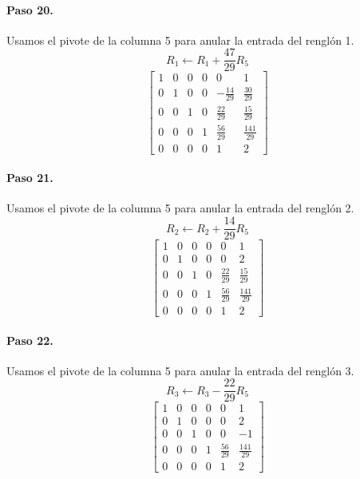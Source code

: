 \documentclass[12pt]{article}
\theoremstyle{remark}
\begin{document}
\paragraph{Paso 20.} Usamos el pivote de la columna 5 para anular la entrada del renglón 1.
\[
R_{1}\leftarrow R_{1}+\frac{47}{29}R_{5}
\]
\[
\left[\begin{array}{ccccc|c}
1 & 0 & 0 & 0 & 0 & 1\\
0 & 1 & 0 & 0 & - \frac{14}{29} & \frac{30}{29}\\
0 & 0 & 1 & 0 & \frac{22}{29} & \frac{15}{29}\\
0 & 0 & 0 & 1 & \frac{56}{29} & \frac{141}{29}\\
0 & 0 & 0 & 0 & 1 & 2
\end{array}\right]
\]
\paragraph{Paso 21.} Usamos el pivote de la columna 5 para anular la entrada del renglón 2.
\[
R_{2}\leftarrow R_{2}+\frac{14}{29}R_{5}
\]
\[
\left[\begin{array}{ccccc|c}
1 & 0 & 0 & 0 & 0 & 1\\
0 & 1 & 0 & 0 & 0 & 2\\
0 & 0 & 1 & 0 & \frac{22}{29} & \frac{15}{29}\\
0 & 0 & 0 & 1 & \frac{56}{29} & \frac{141}{29}\\
0 & 0 & 0 & 0 & 1 & 2
\end{array}\right]
\]
\paragraph{Paso 22.} Usamos el pivote de la columna 5 para anular la entrada del renglón 3.
\[
R_{3}\leftarrow R_{3}-\frac{22}{29}R_{5}
\]
\[
\left[\begin{array}{ccccc|c}
1 & 0 & 0 & 0 & 0 & 1\\
0 & 1 & 0 & 0 & 0 & 2\\
0 & 0 & 1 & 0 & 0 & -1\\
0 & 0 & 0 & 1 & \frac{56}{29} & \frac{141}{29}\\
0 & 0 & 0 & 0 & 1 & 2
\end{array}\right]
\]
\end{document}
